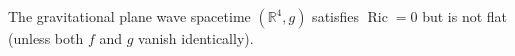 The gravitational plane wave spacetime $(\mathbb{R}^4, g)$ satisfies $\operatorname{Ric} = 0$ but is not flat (unless both $f$ and $g$ vanish identically).

